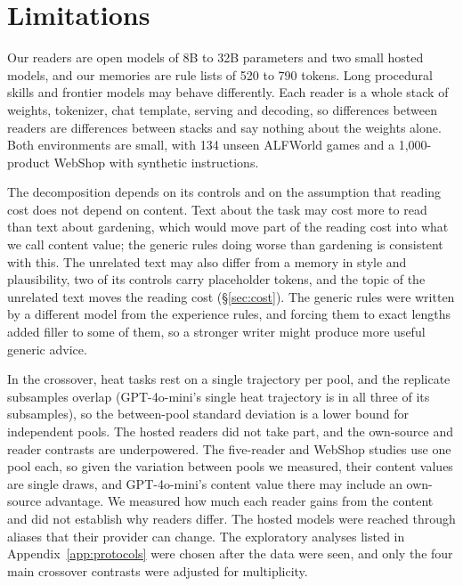 \section*{Limitations}

Our readers are open models of 8B to 32B parameters and two small hosted models, and our memories are
rule lists of 520 to 790 tokens. Long procedural skills and frontier models may behave differently. Each
reader is a whole stack of weights, tokenizer, chat template, serving and decoding, so differences
between readers are differences between stacks and say nothing about the weights alone. Both
environments are small, with 134 unseen ALFWorld games and a 1,000-product WebShop with synthetic
instructions.

The decomposition depends on its controls and on the assumption that reading cost does not depend on
content. Text about the task may cost more to read than text about gardening, which would move part of
the reading cost into what we call content value; the generic rules doing worse than gardening is
consistent with this. The unrelated text may also differ from a memory in style and plausibility, two of
its controls carry placeholder tokens, and the topic of the unrelated text moves the reading cost
(\S\ref{sec:cost}). The
generic rules were written by a different model from the experience rules, and forcing them to exact
lengths added filler to some of them, so a stronger writer might produce more useful generic advice.

In the crossover, heat tasks rest on a single trajectory per pool, and the replicate subsamples overlap
(GPT-4o-mini's single heat trajectory is in all three of its subsamples), so the between-pool standard
deviation is a lower bound for independent pools. The hosted readers did not take part, and the
own-source and reader contrasts are underpowered. The five-reader and WebShop studies use one pool each,
so given the variation between pools we measured, their content values are single draws, and
GPT-4o-mini's content value there may include an own-source advantage. We measured how much each reader gains from the content and did not establish why
readers differ. The hosted models were reached through aliases that their provider can change. The exploratory analyses listed in
Appendix~\ref{app:protocols} were chosen after the data were seen, and only the four main crossover
contrasts were adjusted for multiplicity.



\appendix

